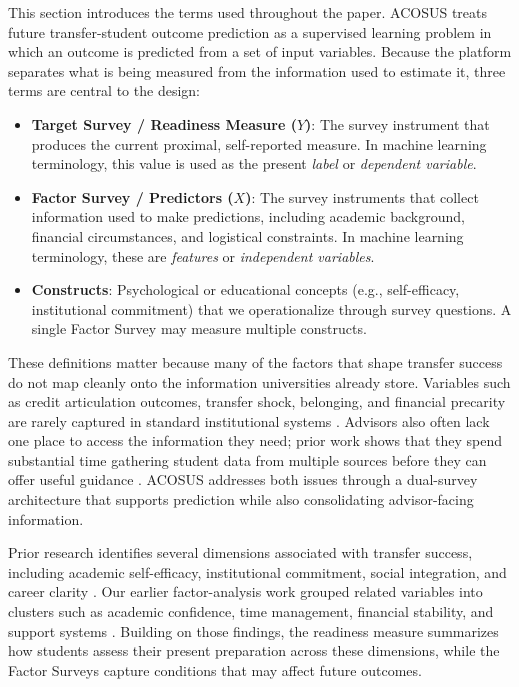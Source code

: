\documentclass[letterpaper,11pt]{article}
\begin{document}
This section introduces the terms used throughout the paper. ACOSUS treats future transfer-student outcome prediction as a supervised learning problem in which an outcome is predicted from a set of input variables. Because the platform separates what is being measured from the information used to estimate it, three terms are central to the design:

\begin{itemize}
    \item \textbf{Target Survey / Readiness Measure ($Y$)}: The survey instrument that produces the current proximal, self-reported measure. In machine learning terminology, this value is used as the present \emph{label} or \emph{dependent variable}.
    \item \textbf{Factor Survey / Predictors ($X$)}: The survey instruments that collect information used to make predictions, including academic background, financial circumstances, and logistical constraints. In machine learning terminology, these are \emph{features} or \emph{independent variables}.
    \item \textbf{Constructs}: Psychological or educational concepts (e.g., self-efficacy, institutional commitment) that we operationalize through survey questions. A single Factor Survey may measure multiple constructs.
\end{itemize}

These definitions matter because many of the factors that shape transfer success do not map cleanly onto the information universities already store. Variables such as credit articulation outcomes, transfer shock, belonging, and financial precarity are rarely captured in standard institutional systems \parencite{nguyen2025school}. Advisors also often lack one place to access the information they need; prior work shows that they spend substantial time gathering student data from multiple sources before they can offer useful guidance \parencite{preposttransfer2014}. ACOSUS addresses both issues through a dual-survey architecture that supports prediction while also consolidating advisor-facing information.

Prior research identifies several dimensions associated with transfer success, including academic self-efficacy, institutional commitment, social integration, and career clarity \parencite{factoranalysis2023}. Our earlier factor-analysis work grouped related variables into clusters such as academic confidence, time management, financial stability, and support systems \parencite{factoranalysis2023}. Building on those findings, the readiness measure summarizes how students assess their present preparation across these dimensions, while the Factor Surveys capture conditions that may affect future outcomes.
\end{document}
